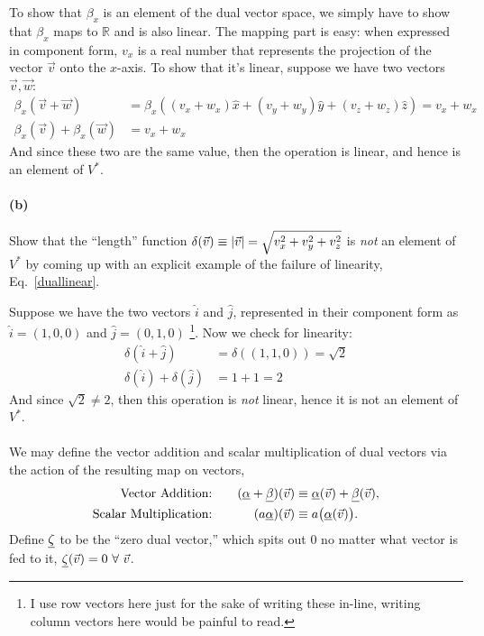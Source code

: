 \documentclass{article}
\begin{document}
\begin{solution}
    To show that $\beta_x$ is an element of the dual vector space, we simply have to show that $\beta_x$ maps to $\mathbb R$ and is also linear. The mapping part is easy: when expressed in component form, $v_x$ is a real number that represents the projection of the vector $\vec v$ onto the $x$-axis. To show that it's linear, suppose we have two vectors $\vec v, \vec w$:
    \begin{align*}
        \beta_x(\vec v + \vec w) &= \beta_x((v_x + w_x)\hat x + (v_y + w_y)\hat y + (v_z + w_z) \hat z) = v_x + w_x\\
        \beta_x(\vec v) + \beta_x(\vec w) &= v_x + w_x
    \end{align*}
    And since these two are the same value, then the operation is linear, and hence is an element of $V^*$.
\end{solution}


\paragraph{(b)}
Show that the ``length'' function $\delta(\vec{v}) \equiv \left|{\vec{v}}\right| = \sqrt{v_{x}^{2}+v_{y}^{2}+v_{z}^{2}}$ is \emph{not} an element of $V^{*}$ by coming up
with an explicit example of the failure of linearity, Eq.~\ref{duallinear}.

\begin{solution}
    Suppose we have the two vectors $\hat i$ and $\hat j$, represented in their component form as $\hat i = (1, 0, 0)$ and $\hat j = (0, 1, 0)$ \footnote{I use row vectors here just for the sake of writing these in-line, writing column vectors here would be painful to read.}. Now we check for linearity:
    \begin{align*}
        \delta(\hat i + \hat j) &= \delta((1, 1, 0)) = \sqrt{2}\\
        \delta(\hat i) + \delta(\hat j) &= 1 + 1 = 2
    \end{align*}
    And since $\sqrt{2} \neq 2$, then this operation is \textit{not} linear, hence it is not an element of $V^*$.
\end{solution}

\paragraph{}
We may define the vector addition and scalar multiplication of dual vectors via the action of the resulting map on vectors,
	\begin{alignat*}{2}
		\textrm{Vector Addition:} &\quad& (\underline{\alpha}+\underline{\beta})(\vec{v}) &\equiv \underline{\alpha}(\vec{v}) + \underline{\beta}(\vec{v}),\\
		\textrm{Scalar Multiplication:} && (a\underline{\alpha})(\vec{v}) &\equiv a\big(\underline{\alpha}(\vec{v})\big).	
	\end{alignat*}
Define $\underline{\zeta}$ to be the ``zero dual vector,'' which spits out 0 no matter what vector is fed to it, $\dual{\zeta}(\vec{v}) = 0\ \forall\ \vec{v}$.
\end{document}
